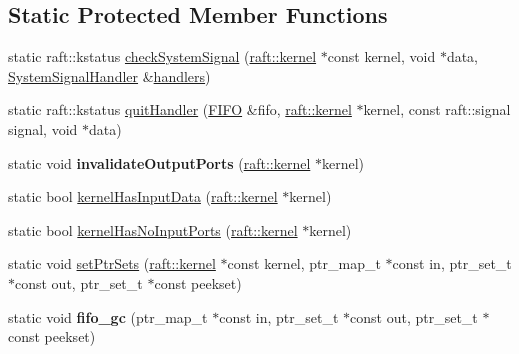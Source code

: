 \subsection*{Static Protected Member Functions}
\begin{DoxyCompactItemize}
\item 
static raft\+::kstatus \hyperlink{class_schedule_a85de3d48407aa378ccc86a4a4206b32a}{check\+System\+Signal} (\hyperlink{classraft_1_1kernel}{raft\+::kernel} $\ast$const kernel, void $\ast$data, \hyperlink{class_system_signal_handler}{System\+Signal\+Handler} \&\hyperlink{class_schedule_ad248e99611a87776fb411836cd46a603}{handlers})
\item 
static raft\+::kstatus \hyperlink{class_schedule_a5167d622689a34ea5f3a065304295521}{quit\+Handler} (\hyperlink{class_f_i_f_o}{F\+I\+FO} \&fifo, \hyperlink{classraft_1_1kernel}{raft\+::kernel} $\ast$kernel, const raft\+::signal signal, void $\ast$data)
\item 
\hypertarget{class_schedule_a3bf10fd9419c58849d7be98336dc0aff}{}\label{class_schedule_a3bf10fd9419c58849d7be98336dc0aff} 
static void {\bfseries invalidate\+Output\+Ports} (\hyperlink{classraft_1_1kernel}{raft\+::kernel} $\ast$kernel)
\item 
static bool \hyperlink{class_schedule_ac23de3dd63554401fd0d8d23b60eecfa}{kernel\+Has\+Input\+Data} (\hyperlink{classraft_1_1kernel}{raft\+::kernel} $\ast$kernel)
\item 
static bool \hyperlink{class_schedule_a2e2035e0c0666054f8401ad2b3792854}{kernel\+Has\+No\+Input\+Ports} (\hyperlink{classraft_1_1kernel}{raft\+::kernel} $\ast$kernel)
\item 
static void \hyperlink{class_schedule_aefaf185cc7d1f424cef7b23d8f679d47}{set\+Ptr\+Sets} (\hyperlink{classraft_1_1kernel}{raft\+::kernel} $\ast$const kernel, ptr\+\_\+map\+\_\+t $\ast$const in, ptr\+\_\+set\+\_\+t $\ast$const out, ptr\+\_\+set\+\_\+t $\ast$const peekset)
\item 
\hypertarget{class_schedule_a64d4c026c95da079a92d2a3790bb5279}{}\label{class_schedule_a64d4c026c95da079a92d2a3790bb5279} 
static void {\bfseries fifo\+\_\+gc} (ptr\+\_\+map\+\_\+t $\ast$const in, ptr\+\_\+set\+\_\+t $\ast$const out, ptr\+\_\+set\+\_\+t $\ast$const peekset)
\end{DoxyCompactItemize}
